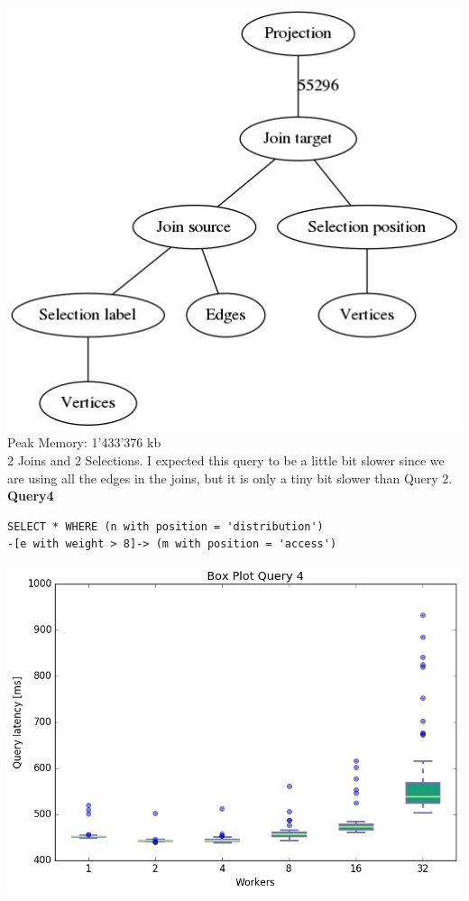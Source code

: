 \documentclass[11pt,singlecolumn]{scrartcl}
\begin{document}
\includegraphics[width=1\textwidth]{graph3}
Peak Memory: 1'433'376 kb \\
2 Joins and 2 Selections. I expected this query to be a little bit slower since we are using all the edges in the joins, but it is only a tiny bit slower than Query 2.
\clearpage
\textbf{Query4}\\
\begin{verbatim}
SELECT * WHERE (n with position = 'distribution')
-[e with weight > 8]-> (m with position = 'access')\end{verbatim}
\includegraphics[width=1\textwidth]{box/q4}
\end{document}
